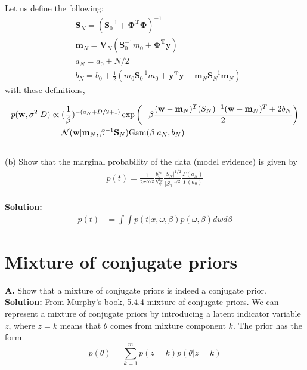 \documentclass{article}
\begin{document}
Let us define the following:
\begin{equation}
\begin{aligned}
& \mathbf{S}_{N} = (\mathbf{S}_{0}^{-1} + \mathbf{\Phi^{T}\Phi} )^{-1} \\
& \mathbf{m}_{N} = \mathbf{V}_{N} (\mathbf{S}_{0}^{-1} m_{0} + \mathbf{\Phi^{T}y}) \\
& a_{N} = a_{0} + N/2 \\
& b_{N} = b_{0} + \frac{1}{2} \left(m_{0}\mathbf{S}_{0}^{-1}m_{0} + \mathbf{y^{T}y} - \mathbf{m}_{N} \mathbf{S}_{N} ^{-1} \mathbf{m}_{N}\right) 
\end{aligned}
\end{equation}
with these definitions,

\begin{equation}
\begin{aligned}
    p(\mathbf{w},\sigma^2|D) &   \propto (\frac{1}{\beta})^{-(a_{N}+D/2+1)} \exp \left( -\beta \frac{(\mathbf{w} - \mathbf{m}_{N})^{T}(S_{N})^{-1} (\mathbf{w} - \mathbf{m}_{N})^{T}+2b_{N}}{2}\right) \\
    & = \mathcal{N} (\mathbf{w}| \mathbf{m}_{N},\beta^{-1} \mathbf{S}_{N}) {\rm Gam} (\beta| a_{N},b_{N}) 
\end{aligned}
\end{equation}
\\
(b) Show that the marginal probability of the data (model evidence) is given by
\begin{equation} 
\begin{aligned}
    p(t) = \frac{1}{2\pi^{N/2}}\frac{b_{0}^{a_{0}}}{b_{N}^{a_{N}}} \frac{|S_{N}|^{1/2}}{|S_{0}|^{1/2}} \frac{\Gamma(a_{N})}{\Gamma(a_{0})}
\end{aligned}
\end{equation}
\\
\textbf{Solution:}
\begin{equation} 
\begin{aligned}
    p(t) & =   \int \int p(t|x,\omega,\beta) p(\omega, \beta) dw d\beta 
\end{aligned}
\end{equation}

\newpage
\section{Mixture of conjugate priors}
\textbf{A.} Show that a mixture of conjugate priors is indeed a conjugate prior.\\
\textbf{Solution: }
From Murphy's book, 5.4.4 mixture of conjugate priors.
We can represent a mixture of conjugate priors by introducing a latent indicator variable $z$, where $z = k$ means that $\theta$ comes from mixture component $k$. The prior has the form
\begin{equation}
p(\theta) = \sum_{k=1}^mp(z=k)p(\theta|z=k)
\end{equation}
\end{document}
